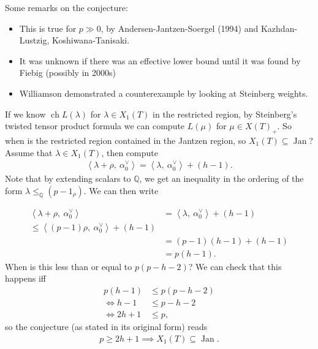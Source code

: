\begin{remark}

Some remarks on the conjecture:

\begin{itemize}
\item
  This is true for \(p\gg 0\), by Andersen-Jantzen-Soergel (1994) and
  Kazhdan-Lustzig, Koshiwana-Tanisaki.
\item
  It was unknown if there was an effective lower bound until it was
  found by Fiebig (possibly in 2000s)
\item
  Williamson demonstrated a counterexample by looking at Steinberg
  weights.
\end{itemize}

\end{remark}

If we know \(\operatorname{ch}L(\lambda)\) for \(\lambda \in X_1(T)\) in
the restricted region, by Steinberg's twisted tensor product formula we
can compute \(L(\mu)\) for \(\mu \in X(T)_+\). So when is the restricted
region contained in the Jantzen region, so
\(X_1(T) \subseteq \operatorname{Jan}\)? Assume that
\(\lambda \in X_1(T)\), then compute
\begin{align*}  
{\left\langle {\lambda+\rho},~{\alpha_0^\vee} \right\rangle} = {\left\langle {\lambda},~{\alpha_0^\vee} \right\rangle} + (h-1)
.\end{align*}
Note that by extending scalars to \({\mathbb{Q}}\), we get an inequality
in the ordering of the form \(\lambda \leq_{\mathbb{Q}}(p-1_\rho)\). We
can then write

\begin{align*}  
{\left\langle {\lambda+\rho},~{\alpha_0^\vee} \right\rangle} 
&= {\left\langle {\lambda},~{\alpha_0^\vee} \right\rangle} + (h-1) \\
\leq {\left\langle {(p-1) \rho},~{\alpha_0^\vee} \right\rangle} + (h-1)  \\
&= (p-1)(h-1) + (h-1) \\
&= p(h-1) 
.\end{align*}
When is this less than or equal to \(p(p-h-2)\)? We can check that this
happens iff
\begin{align*}  
p(h-1) &\leq p(p-h-2) \\
\iff h-1 &\leq p-h-2 \\
\iff 2h+1 &\leq p
,\end{align*}
so the conjecture (as stated in its original form) reads
\begin{align*}  
p\geq 2h+1 \implies X_1(T) \subseteq \operatorname{Jan}
.\end{align*}


